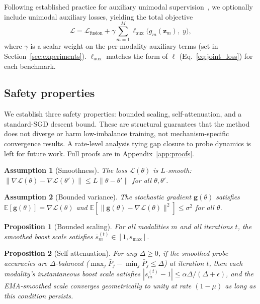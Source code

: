 \documentclass{article} %
\newtheorem{assumption}{Assumption}
\newtheorem{proposition}{Proposition}
\newcommand{\loss}{\mathcal{L}}
\begin{document}
Following established practice for auxiliary unimodal supervision~\citep{guo2024cggm}, we optionally include unimodal auxiliary losses, yielding the total objective
%
\begin{equation}
\label{eq:total_loss}
\loss = \loss_{\text{fusion}} + \gamma \sum_{m=1}^{M} \ell_{\text{aux}}\!\bigl(g_m(\mathbf{z}_m),\; y\bigr),
\end{equation}
%
where $\gamma$ is a scalar weight on the per-modality auxiliary terms (set in Section~\ref{sec:experiments}). $\ell_{\text{aux}}$ matches the form of $\ell$ (Eq.~\ref{eq:joint_loss}) for each benchmark.


\subsection{Safety properties}
\label{sec:convergence}

We establish three safety properties: bounded scaling, self-attenuation, and a standard-SGD descent bound. These are structural guarantees that the method does not diverge or harm low-imbalance training, not mechanism-specific convergence results. A rate-level analysis tying gap closure to probe dynamics is left for future work. Full proofs are in Appendix~\ref{app:proofs}.

\begin{assumption}[Smoothness]
\label{asm:smooth}
The loss $\loss(\theta)$ is $L$-smooth: $\|\nabla \loss(\theta) - \nabla \loss(\theta')\| \leq L\|\theta - \theta'\|$ for all $\theta, \theta'$.
\end{assumption}

\begin{assumption}[Bounded variance]
\label{asm:variance}
The stochastic gradient $\mathbf{g}(\theta)$ satisfies $\mathbb{E}[\mathbf{g}(\theta)] = \nabla \loss(\theta)$ and $\mathbb{E}[\|\mathbf{g}(\theta) - \nabla \loss(\theta)\|^2] \leq \sigma^2$ for all $\theta$.
\end{assumption}

\begin{proposition}[Bounded scaling]
\label{prop:bounded}
For all modalities $m$ and all iterations $t$, the smoothed boost scale satisfies $\bar{s}_m^{(t)} \in [1, s_{\max}]$.
\end{proposition}

\begin{proposition}[Self-attenuation]
\label{prop:attenuation}
For any $\Delta \geq 0$, if the smoothed probe accuracies are $\Delta$-balanced ($\max_j \bar{P}_j - \min_j \bar{P}_j \leq \Delta$) at iteration $t$, then each modality's instantaneous boost scale satisfies $|s_m^{(t)} - 1| \leq \alpha \Delta / (\Delta + \epsilon)$, and the EMA-smoothed scale converges geometrically to unity at rate $(1-\mu)$ as long as this condition persists.
\end{proposition}
\end{document}
